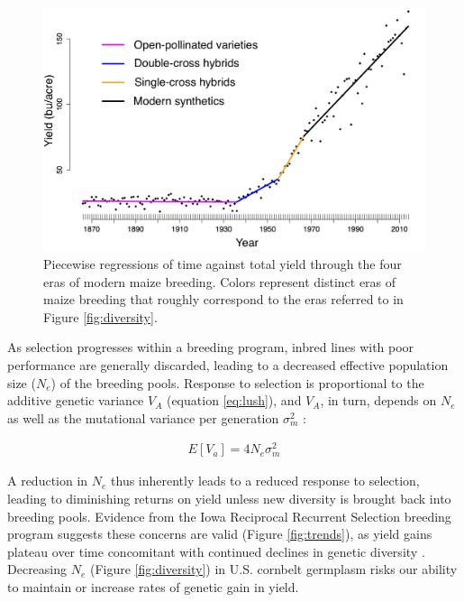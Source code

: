 \documentclass[12pt]{article}
\begin{document}
\begin{figure}
\includegraphics[width=0.6\linewidth]{yield.png}
\caption{Piecewise regressions of time against total yield through the four eras of modern maize breeding. Colors represent distinct eras of maize breeding that roughly correspond to the eras  referred to in Figure \ref{fig:diversity}.} 
\label{fig:piecewise}
\end{figure}

As selection progresses within a breeding program, inbred lines with poor performance are generally discarded, leading to a decreased effective population size ($N_e$) of the breeding pools.
Response to selection is proportional to the additive genetic variance $V_A$ (equation \ref{eq:lush}), and $V_A$, in turn, depends on $N_e$ as well as the mutational variance per generation ${\sigma}_m^2$ \citep{whitlock1999neutral}:

\begin{align}
E[V_a] = 4N_e {\sigma}_m^2
\label{eq:whitlock}
\end{align}

A reduction in $N_e$ thus inherently leads to a reduced response to selection, leading to diminishing returns on yield unless new diversity is brought back into breeding pools.
Evidence from the Iowa Reciprocal Recurrent Selection breeding program suggests these concerns are valid (Figure \ref{fig:trends}), as yield gains plateau over time \citep{rouse2003selection} concomitant with continued declines in genetic diversity \citep{Gerke:2013tw}.
Decreasing $N_e$ (Figure \ref{fig:diversity}) in U.S. cornbelt germplasm risks our ability to maintain or increase rates of genetic gain in yield.
\end{document}
